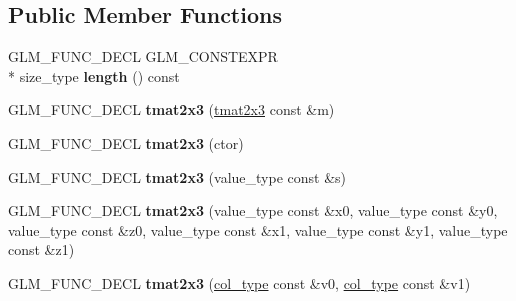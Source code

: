 \subsection*{Public Member Functions}
\begin{DoxyCompactItemize}
\item 
\hypertarget{structglm_1_1detail_1_1tmat2x3_ad64fb15bec8eacecffd0ba33083ec197}{G\-L\-M\-\_\-\-F\-U\-N\-C\-\_\-\-D\-E\-C\-L G\-L\-M\-\_\-\-C\-O\-N\-S\-T\-E\-X\-P\-R \\*
size\-\_\-type {\bfseries length} () const }\label{structglm_1_1detail_1_1tmat2x3_ad64fb15bec8eacecffd0ba33083ec197}

\item 
\hypertarget{structglm_1_1detail_1_1tmat2x3_a882c554a039fb6f05295d25230876408}{G\-L\-M\-\_\-\-F\-U\-N\-C\-\_\-\-D\-E\-C\-L {\bfseries tmat2x3} (\hyperlink{structglm_1_1detail_1_1tmat2x3}{tmat2x3} const \&m)}\label{structglm_1_1detail_1_1tmat2x3_a882c554a039fb6f05295d25230876408}

\item 
\hypertarget{structglm_1_1detail_1_1tmat2x3_a55e83395bf56965a48cd4604b4644cab}{G\-L\-M\-\_\-\-F\-U\-N\-C\-\_\-\-D\-E\-C\-L {\bfseries tmat2x3} (ctor)}\label{structglm_1_1detail_1_1tmat2x3_a55e83395bf56965a48cd4604b4644cab}

\item 
\hypertarget{structglm_1_1detail_1_1tmat2x3_abf51ec12b9ea2ee650ef0cd4854a85cc}{G\-L\-M\-\_\-\-F\-U\-N\-C\-\_\-\-D\-E\-C\-L {\bfseries tmat2x3} (value\-\_\-type const \&s)}\label{structglm_1_1detail_1_1tmat2x3_abf51ec12b9ea2ee650ef0cd4854a85cc}

\item 
\hypertarget{structglm_1_1detail_1_1tmat2x3_a723c041ca01d0846e7ac1e2cf94fa388}{G\-L\-M\-\_\-\-F\-U\-N\-C\-\_\-\-D\-E\-C\-L {\bfseries tmat2x3} (value\-\_\-type const \&x0, value\-\_\-type const \&y0, value\-\_\-type const \&z0, value\-\_\-type const \&x1, value\-\_\-type const \&y1, value\-\_\-type const \&z1)}\label{structglm_1_1detail_1_1tmat2x3_a723c041ca01d0846e7ac1e2cf94fa388}

\item 
\hypertarget{structglm_1_1detail_1_1tmat2x3_a6219dd710c9dc7a235745543995c2034}{G\-L\-M\-\_\-\-F\-U\-N\-C\-\_\-\-D\-E\-C\-L {\bfseries tmat2x3} (\hyperlink{structglm_1_1detail_1_1tvec3}{col\-\_\-type} const \&v0, \hyperlink{structglm_1_1detail_1_1tvec3}{col\-\_\-type} const \&v1)}\label{structglm_1_1detail_1_1tmat2x3_a6219dd710c9dc7a235745543995c2034}


\end{DoxyCompactItemize}
